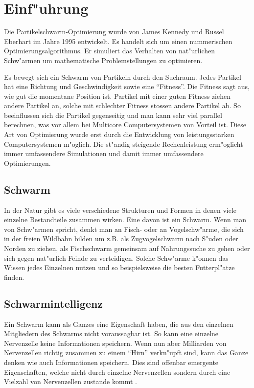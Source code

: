 \section{Einf"uhrung}
Die Partikelschwarm-Optimierung wurde von James Kennedy und
Russel Eberhart
im Jahre 1995 entwickelt. Es handelt sich um einen nummerischen
Optimierungsalgorithmus. Er simuliert das Verhalten von nat"urlichen
Schw"armen um mathematische Problemstellungen zu optimieren.

Es bewegt sich ein Schwarm von Partikeln durch den Suchraum. Jedes
Partikel hat eine Richtung und Geschwindigkeit sowie eine ``Fitness''. Die
Fitness sagt aus, wie gut die momentane Position ist. Partikel mit einer
guten Fitness ziehen andere Partikel an, solche mit schlechter Fitness
stossen andere Partikel ab. So beeinflussen sich die Partikel gegenseitig
und man kann sehr viel parallel berechnen, was vor allem bei Multicore
Computersystemen von Vorteil ist.
Diese Art von Optimierung wurde erst durch die Entwicklung von
leistungsstarken Computersystemen m"oglich. Die st"andig steigende
Rechenleistung erm"oglicht immer umfassendere Simulationen und damit
immer umfassendere Optimierungen.

\subsection{Schwarm}
In der Natur gibt es viele verschiedene Strukturen und Formen in denen
viele einzelne Bestandteile zusammen wirken. Eine davon ist ein Schwarm.
Wenn man von Schw"armen spricht, denkt man an Fisch- oder an
Vogelschw"arme, die sich in der freien Wildbahn  bilden um z.B. als
Zugvogelschwarm nach S"uden oder Norden zu ziehen, als Fischschwarm
gemeinsam auf Nahrungssuche zu gehen oder sich gegen nat"urlich Feinde zu
verteidigen. Solche Schw"arme k"onnen das Wissen jedes Einzelnen nutzen
und so beispielsweise die besten Futterpl"atze finden.

\subsection{Schwarmintelligenz}
Ein Schwarm kann als Ganzes eine Eigenschaft haben, die aus den
einzelnen Mitgliedern des Schwarms nicht voraussagbar ist. So kann
eine einzelne Nervenzelle keine Informationen speichern. Wenn nun aber
Milliarden von Nervenzellen richtig zusammen zu einem ``Hirn'' verkn"upft sind, kann das Ganze denken wie auch
Informationen speichern. Dies sind offenbar emergente Eigenschaften,
welche nicht durch einzelne Nervenzellen sondern durch eine Vielzahl
von Nervenzellen zustande kommt
\cite{partice-swarm-optimization}.

